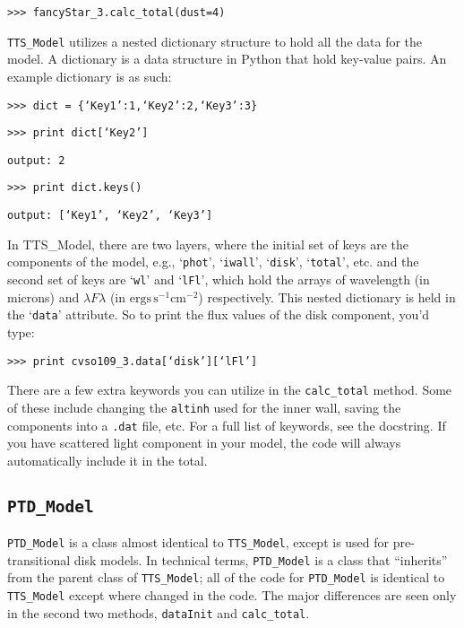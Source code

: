 \documentclass{article}
\begin{document}
\vspace{2mm}
\texttt{>>> fancyStar\_3.calc\_total(dust=4)}
\vspace{2mm}
 
\texttt{TTS\_Model} utilizes a nested dictionary structure to hold all the data for the model. A dictionary is a data structure in Python that hold key-value pairs. An example dictionary is as such: 
 
\vspace{2mm}
\texttt{>>> dict = \{‘Key1’:1,‘Key2’:2,‘Key3’:3\}}

\texttt{>>> print dict[‘Key2’]}

\texttt{output: 2 }

\texttt{>>> print dict.keys() }

\texttt{output: [‘Key1’, ‘Key2’, ‘Key3’] }
\vspace{2mm}
 
In TTS\_Model, there are two layers, where the initial set of keys are the components of the model, e.g., `\texttt{phot}', `\texttt{iwall}', `\texttt{disk}', `\texttt{total}', etc. and the second set of keys are `\texttt{wl}' and `\texttt{lFl}’, which hold the arrays of wavelength (in microns) and $\lambda F\lambda $ (in $\mbox{ergs}\, \mbox{s}^{-1} \mbox{cm}^{-2}$) respectively. This nested dictionary is held in the ‘\texttt{data}’ attribute. So to print the flux values of the disk component, you’d type: 
 
\vspace{2mm}
\texttt{>>> print cvso109\_3.data[‘disk’][‘lFl’]}
\vspace{2mm}

There are a few extra keywords you can utilize in the \texttt{calc\_total} method. Some of these include changing the \texttt{altinh} used for the inner wall, saving the components into a \texttt{.dat} file, etc. For a full list of keywords, see the docstring. If you have scattered light component in your model, the code will always automatically include it in the total. 
 
\subsection{\texttt{PTD\_Model}}
 
\texttt{PTD\_Model} is a class almost identical to \texttt{TTS\_Model}, except is used for pre-transitional disk models. In technical terms, \texttt{PTD\_Model} is a class that “inherits” from the parent class of \texttt{TTS\_Model}; all of the code for \texttt{PTD\_Model} is identical to \texttt{TTS\_Model} except where changed in the code. The major differences are seen only in the second two methods, \texttt{dataInit} and \texttt{calc\_total}.
 
\end{document}
